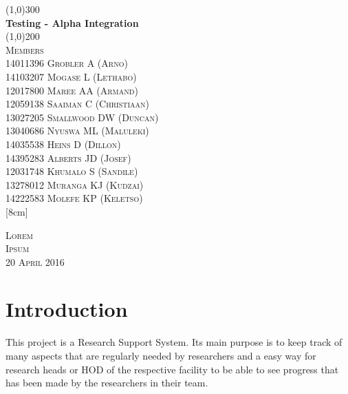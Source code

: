 \documentclass{article}
\begin{document}
\begin{titlepage}
	\begin{center}
		\line(1,0){300}\\
		[6mm]
		\huge{\bfseries Testing - Alpha Integration}\\
		[2mm]
		\line(1,0){200}\\
		[15mm]
		\textsc{\large Members}\\
		[7.5mm]
		\textsc{
                \large14011396	Grobler	A (Arno) \\
                14103207	Mogase	L (Lethabo)\\
                12017800	Maree	AA (Armand)\\
                12059138	Saaiman	C (Christiaan)\\
                13027205	Smallwood	DW (Duncan)\\
                13040686	Nyuswa	ML (Maluleki)\\
                14035538	Heins	D (Dillon)\\
                14395283	Alberts	JD (Josef)\\
                12031748	Khumalo	S (Sandile)\\
                13278012	Muranga	KJ (Kudzai)\\
                14222583	Molefe	KP (Keletso)\\
            }
		[8cm]
	\end{center}
	
	\begin{flushright}
		\textsc{\large Lorem\\
		Ipsum\\
		20 April 2016\\}
	\end{flushright}
\end{titlepage}

\tableofcontents
\thispagestyle{empty}
\cleardoublepage
%

\setcounter{page}{1}
%

\section{Introduction}\label{sec:intro}
    This project is a Research Support System. Its main purpose is to keep track of many aspects that are regularly needed by researchers and a easy way for research heads or HOD of the respective facility to be able to see progress that has been made by the researchers in their team.
    
\end{document}
